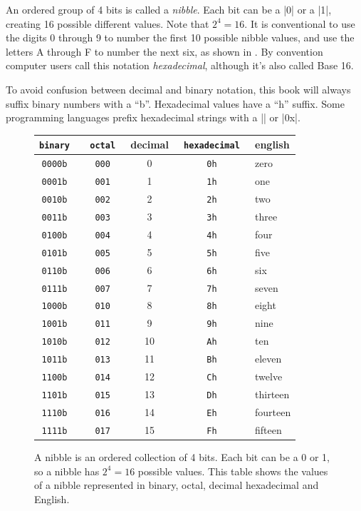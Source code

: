 An ordered group of 4 bits is called a \emph{nibble}. Each bit can be
a |0| or a |1|, creating 16 possible different values. Note
that $2^4=16$. It is conventional to use the digits 0 through 9 to
number the first 10 possible nibble values, and use the letters A
through F to number the next six, as shown in . By
convention computer users call this notation \emph{hexadecimal},
although it's also called Base 16.

To avoid confusion between decimal and binary notation, this book will
always suffix binary numbers with a ``b''. Hexadecimal values have a
``h'' suffix. Some programming languages prefix hexadecimal strings
with a |\x| or |0x|. 



\begin{figure}
\begin{tabular}{>{\tt}c>{\tt}cc>{\tt}cl}
\textrm{binary} & \textrm{octal} & decimal & \textrm{hexadecimal} & english \\
\hline
0000b & 000 & 0 & 0h & zero \\
0001b & 001 & 1 & 1h & one \\
0010b & 002 & 2 & 2h & two \\
0011b & 003 & 3 & 3h & three \\
0100b & 004 & 4 & 4h & four \\
0101b & 005 & 5 & 5h & five \\
0110b & 006 & 6 & 6h & six \\
0111b & 007 & 7 & 7h & seven \\
1000b & 010 & 8 & 8h & eight \\
1001b & 011 & 9 & 9h & nine \\
1010b & 012 & 10& Ah & ten \\
1011b & 013 & 11& Bh & eleven \\
1100b & 014 & 12& Ch & twelve \\
1101b & 015 & 13& Dh & thirteen \\
1110b & 016 & 14& Eh & fourteen \\
1111b & 017 & 15& Fh & fifteen \\
\hline
\end{tabular}
\caption{A nibble is an ordered collection of 4 bits. Each bit can be
  a 0 or 1, so a nibble has $2^4=16$ possible values. This table shows
  the values of a nibble represented in binary, octal, decimal hexadecimal and English.}\label{nibble}
\end{figure}

